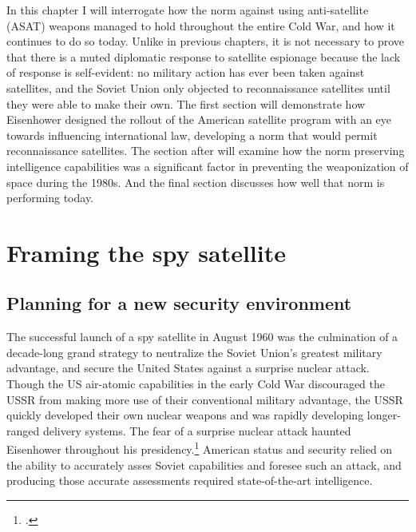 \documentclass{report}
\begin{document}
In this chapter I will interrogate how the norm against using anti-satellite (ASAT) weapons managed to hold throughout the entire Cold War, and how it continues to do so today. Unlike in previous chapters, it is not necessary to prove that there is a muted diplomatic response to satellite espionage because the lack of response is self-evident: no military action has ever been taken against satellites, and the Soviet Union only objected to reconnaissance satellites until they were able to make their own. The first section will demonstrate how Eisenhower designed the rollout of the American satellite program with an eye towards influencing international law, developing a norm that would permit reconnaissance satellites. The section after will examine how the norm preserving intelligence capabilities was a significant factor in preventing the weaponization of space during the 1980s. And the final section discusses how well that norm is performing today.

\section{Framing the spy satellite}
\subsection{Planning for a new security environment}
The successful launch of a spy satellite in August 1960 was the culmination of a decade-long grand strategy to neutralize the Soviet Union's greatest military advantage, and secure the United States against a surprise nuclear attack. Though the US air-atomic capabilities in the early Cold War discouraged the USSR from making more use of their conventional military advantage, the USSR quickly developed their own nuclear weapons and was rapidly developing longer-ranged delivery systems. The fear of a surprise nuclear attack haunted Eisenhower throughout his presidency.\footcite[p.~68]{killian_sputnik_1977} American status and security relied on the ability to accurately asses Soviet capabilities and foresee such an attack, and producing those accurate assessments required state-of-the-art intelligence.
\end{document}
